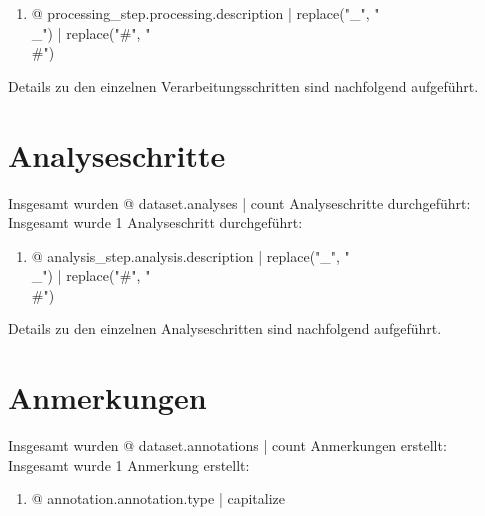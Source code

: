 \begin{enumerate}
\item {@ processing_step.processing.description | replace("_", "\\_") | replace("#", "\\#") }
\end{enumerate}


Details zu den einzelnen Verarbeitungsschritten sind nachfolgend aufgeführt.




\section{Analyseschritte}

Insgesamt wurden {@ dataset.analyses | count } Analyseschritte durchgeführt:
Insgesamt wurde 1 Analyseschritt durchgeführt:

\begin{enumerate}
\item {@ analysis_step.analysis.description | replace("_", "\\_") | replace("#", "\\#") }
\end{enumerate}

Details zu den einzelnen Analyseschritten sind nachfolgend aufgeführt.




\section{Anmerkungen}

Insgesamt wurden {@ dataset.annotations | count } Anmerkungen erstellt:
Insgesamt wurde 1 Anmerkung erstellt:

\begin{enumerate}
\item {@ annotation.annotation.type | capitalize }
\end{enumerate}

